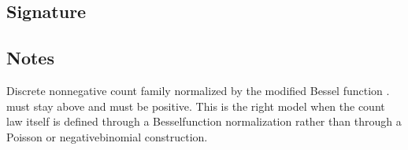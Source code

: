 \documentclass[letterpaper,10pt,english]{sphinxmanual}
\begin{document}
\subsection{Signature}
\label{\detokenize{distribution_catalog:id13}}
\begin{sphinxVerbatim}[commandchars=\\\{\}]
\end{sphinxVerbatim}


\subsection{Notes}
\label{\detokenize{distribution_catalog:id14}}
\sphinxAtStartPar
Discrete non\sphinxhyphen{}negative count family normalized by the modified Bessel function .  must stay above  and  must be positive. This is the right model when the count law itself is defined through a Bessel\sphinxhyphen{}function normalization rather than through a Poisson or negative\sphinxhyphen{}binomial construction.
\end{document}
